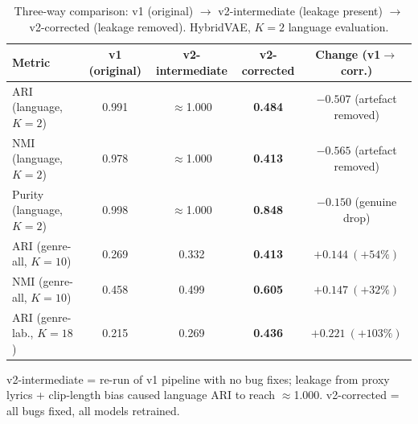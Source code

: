 \documentclass{article}
\begin{document}
\begin{table}[H]
\centering
\caption{Three-way comparison: v1 (original) $\to$ v2-intermediate (leakage present)
$\to$ v2-corrected (leakage removed). HybridVAE, $K\!=\!2$ language evaluation.}
\label{tab:threeway}
\small
\begin{tabular}{lcccc}
\toprule
\textbf{Metric} & \textbf{v1 (original)} & \textbf{v2-intermediate} &
\textbf{v2-corrected} & \textbf{Change (v1$\to$corr.)} \\
\midrule
ARI  (language, $K\!=\!2$) & 0.991 & $\approx$1.000 & \textbf{0.484} & $-0.507$ (artefact removed) \\
NMI  (language, $K\!=\!2$) & 0.978 & $\approx$1.000 & \textbf{0.413} & $-0.565$ (artefact removed) \\
Purity (language, $K\!=\!2$) & 0.998 & $\approx$1.000 & \textbf{0.848} & $-0.150$ (genuine drop) \\
ARI  (genre-all, $K\!=\!10$) & 0.269 & 0.332 & \textbf{0.413} & \boldmath$+0.144~(+54\%)$ \\
NMI  (genre-all, $K\!=\!10$) & 0.458 & 0.499 & \textbf{0.605} & \boldmath$+0.147~(+32\%)$ \\
ARI  (genre-lab., $K\!=\!18$) & 0.215 & 0.269 & \textbf{0.436} & \boldmath$+0.221~(+103\%)$ \\
\bottomrule
\end{tabular}
\vspace{2pt}

{\small v2-intermediate = re-run of v1 pipeline with no bug fixes; leakage from proxy
lyrics + clip-length bias caused language ARI to reach $\approx$1.000. v2-corrected =
all bugs fixed, all models retrained.}
\end{table}
\end{document}
